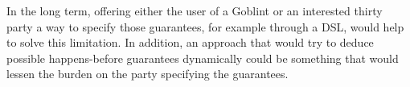 \documentclass[..thesis.tex]{subfiles}
\begin{document}
In the long term, offering either the user of a Goblint or an interested thirty party a way to specify those guarantees,
for example through a DSL,  would help to solve this limitation. In addition, an approach that would try to deduce possible happens-before guarantees dynamically 
could be something that would lessen the burden on the party specifying the guarantees.

\end{document}
